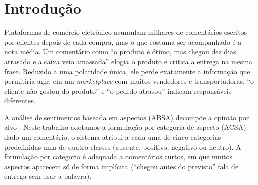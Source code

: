 \documentclass[a4paper, twocolumn, 11pt, twoside]{article}
\begin{document}
\begin{abstract}
Star ratings tell how satisfied a customer is, not why. We frame the problem as aspect-category sentiment analysis (ACSA) over five aspects of Brazilian Portuguese e-commerce reviews, using the human-annotated RePro corpus as gold standard and applying the models to Olist reviews, whose order records include real delivery delays. We test whether a Portuguese encoder beats classical baselines, whether LLM-generated labels on the same texts approach human labels as training signal, and whether predicted ``negative delivery'' tracks real delays beyond the star rating. A fine-tuned BERTimbau reaches 0.918 aspect--polarity pair F1 on the human test set, against 0.867 for the best classical baseline. On Olist, the predicted negative-delivery probability adds discriminative power for late orders beyond the star rating (AUC 0.817 to 0.859), while a placebo aspect does not track delays; in this out-of-domain setting, however, a TF-IDF model performs as well as the encoder. Labels from a free open LLM (4-bit Qwen2.5-7B-Instruct) agree with humans at 0.772 pair F1, and BERTimbau trained on them reaches 0.794, recovering only 11\% of the gap between a 599-label human control and the fully human-trained model, below even the classical baseline trained on human labels.
\end{abstract}


\section{Introdução}

Plataformas de comércio eletrônico acumulam milhares de comentários escritos por clientes depois de cada compra, mas o que costuma ser acompanhado é a nota média. Um comentário como ``o produto é ótimo, mas chegou dez dias atrasado e a caixa veio amassada'' elogia o produto e critica a entrega na mesma frase. Reduzido a uma polaridade única, ele perde exatamente a informação que permitiria agir: em um \emph{marketplace} com muitos vendedores e transportadoras, ``o cliente não gostou do produto'' e ``o pedido atrasou'' indicam responsáveis diferentes.

A análise de sentimentos baseada em aspectos (ABSA) decompõe a opinião por alvo \citep{pontiki2014semeval,zhang2023survey}. Neste trabalho adotamos a formulação por categoria de aspecto (ACSA): dado um comentário, o sistema atribui a cada uma de cinco categorias predefinidas uma de quatro classes (ausente, positivo, negativo ou neutro). A formulação por categoria é adequada a comentários curtos, em que muitos aspectos aparecem só de forma implícita (``chegou antes do previsto'' fala de entrega sem usar a palavra).
\end{document}
